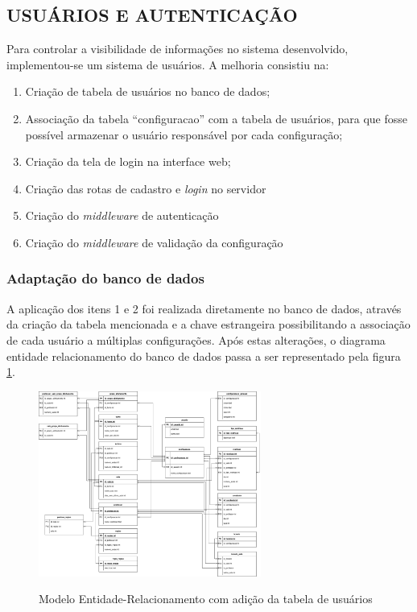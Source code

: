 \subsection{USUÁRIOS E AUTENTICAÇÃO}

Para controlar a visibilidade de informações no sistema desenvolvido, implementou-se um sistema de usuários. A melhoria consistiu na:

\begin{enumerate}
	\item Criação de tabela de usuários no banco de dados;
	\item Associação da tabela ``configuracao'' com a tabela de usuários, para que fosse possível armazenar o usuário responsável por cada configuração;
	\item Criação da tela de login na interface web;
	\item Criação das rotas de cadastro e \textit{login} no servidor
	\item Criação do \textit{middleware} de autenticação
	\item Criação do \textit{middleware} de validação da configuração
\end{enumerate}

\subsubsection{Adaptação do banco de dados}
A aplicação dos itens 1 e 2 foi realizada diretamente no banco de dados, através da criação da tabela mencionada e a chave estrangeira possibilitando a associação de cada usuário a múltiplas configurações. Após estas alterações, o diagrama entidade relacionamento do banco de dados passa a ser representado pela figura \ref{fig:er_atualizado}.

\begin{figure}[!htb]
	\centering
	\caption{Modelo Entidade-Relacionamento com adição da tabela de usuários}
	\includegraphics[width=0.65\textwidth]{./dados/figuras/er_horario_com_usuario}
	\label{fig:er_atualizado}
\end{figure}

